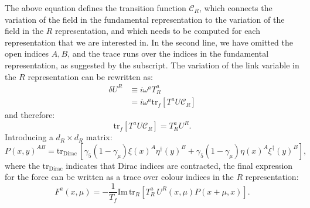 \documentclass{article}[12pt]
\begin{document}
%
The above equation defines the transition function ${\mathcal C}_R$,
which connects the variation of the field in the fundamental
representation to the variation of the field in the $R$
representation, and which needs to be computed for each representation
that we are interested in. In the second line, we have omitted the
open indices $A,B$, and the trace runs over the indices in the
fundamental representation, as suggested by the
subscript. The variation of the link variable in the $R$
representation can be rewritten as:
%
\begin{align}
\delta U^R &\equiv i \omega^a T^a_R \nonumber \\
&= i \omega^a \mathrm{tr}_f\left[T^a U \mathcal{C}_R \right] \label{VARUR}
\end{align}
%
and therefore:
%
\begin{equation}
\mathrm{tr}_f\left[T^a U \mathcal{C}_R \right] = T^a_R U^R.
\end{equation}
%
Introducing a $d_R \times d_R$ matrix:  
%
\begin{equation}
P(x,y)^{AB} = \mathrm{tr}_\mathrm{Dirac}\, \left[
\gamma_5 \left(1-\gamma_\mu\right) \xi(x)^A \eta^\dagger(y)^B +
\gamma_5 \left(1-\gamma_\mu\right) \eta(x)^A \xi^\dagger(y)^B 
\right],
\end{equation}
%
where the $\mathrm{tr}_\mathrm{Dirac}$ indicates that Dirac indices
are contracted, the final expression for the force can be written
as a trace over colour indices in the $R$ representation:
%
\begin{equation}
\label{eq:force}
F^a(x,\mu) = -\frac{1}{T_f} \mathrm{Im}\, \mathrm{tr}_R \left[ T^a_R\, 
U^R(x,\mu) P(x+\mu,x) \right].
\end{equation}
\end{document}
